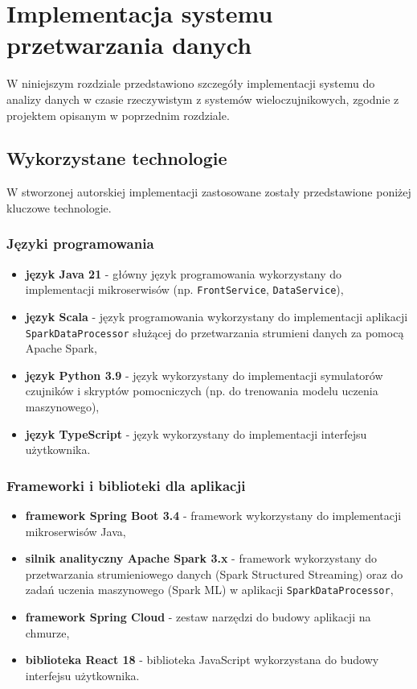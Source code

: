 \section{Implementacja systemu przetwarzania danych}
\label{sec:implementacja_systemu}

W niniejszym rozdziale przedstawiono szczegóły implementacji systemu do analizy danych w czasie rzeczywistym z systemów wieloczujnikowych,
zgodnie z projektem opisanym w poprzednim rozdziale.

\subsection{Wykorzystane technologie}
\label{subsec:technologie}

W stworzonej autorskiej implementacji zastosowane zostały przedstawione poniżej kluczowe technologie.

\subsubsection{Języki programowania}
\label{subsubsec:jezyki_programowania}

\begin{itemize}
    \item \textbf{język Java 21} - główny język programowania wykorzystany do implementacji mikroserwisów (np. \texttt{FrontService}, \texttt{DataService}),
    \item \textbf{język Scala} - język programowania wykorzystany do implementacji aplikacji \texttt{SparkDataProcessor} służącej do przetwarzania strumieni danych za pomocą Apache Spark,
    \item \textbf{język Python 3.9} - język wykorzystany do implementacji symulatorów czujników i skryptów pomocniczych (np. do trenowania modelu uczenia maszynowego),
    \item \textbf{język TypeScript} - język wykorzystany do implementacji interfejsu użytkownika.
\end{itemize}

\subsubsection{Frameworki i biblioteki dla aplikacji}
\label{subsubsec:frameworki}

\begin{itemize}
    \item \textbf{framework Spring Boot 3.4} - framework wykorzystany do implementacji mikroserwisów Java,
    \item \textbf{silnik analityczny Apache Spark 3.x} \cite{spark_streaming} - framework wykorzystany do przetwarzania strumieniowego danych (Spark Structured Streaming) oraz do zadań uczenia maszynowego (Spark ML) w aplikacji \texttt{SparkDataProcessor},
    \item \textbf{framework Spring Cloud} - zestaw narzędzi do budowy aplikacji na chmurze,
    \item \textbf{biblioteka React 18} - biblioteka JavaScript wykorzystana do budowy interfejsu użytkownika.
\end{itemize}

